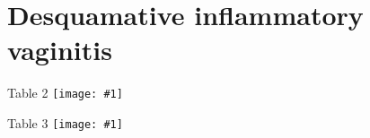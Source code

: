 \documentclass{beamer}
\newcommand*{\solo}[1]{\centering\texttt{[image: \#1]}}
\begin{document}
\section{Desquamative inflammatory vaginitis}

\begin{frame}{Table 2}
    \solo{T2.eps}
\end{frame}

\begin{frame}{Table 3}
    \solo{T3.eps}
\end{frame}
\end{document}
